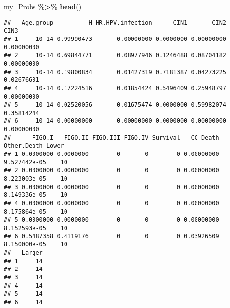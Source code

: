 \documentclass[
]{article}
\newenvironment{Shaded}{\begin{snugshade}}{\end{snugshade}}
\newcommand{\CommentTok}[1]{\textcolor[rgb]{0.56,0.35,0.01}{\textit{#1}}}
\newcommand{\FunctionTok}[1]{\textcolor[rgb]{0.13,0.29,0.53}{\textbf{#1}}}
\newcommand{\NormalTok}[1]{#1}
\newcommand{\SpecialCharTok}[1]{\textcolor[rgb]{0.81,0.36,0.00}{\textbf{#1}}}
\begin{document}
\begin{Shaded}
\end{Shaded}

\begin{Shaded}
\begin{Highlighting}[]
\NormalTok{my\_Probs }\SpecialCharTok{\%\textgreater{}\%}
  \FunctionTok{head}\NormalTok{()}
\end{Highlighting}
\end{Shaded}

\begin{verbatim}
##   Age.group          H HR.HPV.infection      CIN1       CIN2       CIN3
## 1     10-14 0.99990473       0.00000000 0.0000000 0.00000000 0.00000000
## 2     10-14 0.69844771       0.08977946 0.1246488 0.08704182 0.00000000
## 3     10-14 0.19800834       0.01427319 0.7181387 0.04273225 0.02676601
## 4     10-14 0.17224516       0.01854424 0.5496409 0.25948797 0.00000000
## 5     10-14 0.02520056       0.01675474 0.0000000 0.59982074 0.35814244
## 6     10-14 0.00000000       0.00000000 0.0000000 0.00000000 0.00000000
##      FIGO.I   FIGO.II FIGO.III FIGO.IV Survival   CC_Death  Other.Death Lower
## 1 0.0000000 0.0000000        0       0        0 0.00000000 9.527442e-05    10
## 2 0.0000000 0.0000000        0       0        0 0.00000000 8.223003e-05    10
## 3 0.0000000 0.0000000        0       0        0 0.00000000 8.149336e-05    10
## 4 0.0000000 0.0000000        0       0        0 0.00000000 8.175864e-05    10
## 5 0.0000000 0.0000000        0       0        0 0.00000000 8.152593e-05    10
## 6 0.5487358 0.4119176        0       0        0 0.03926509 8.150000e-05    10
##   Larger
## 1     14
## 2     14
## 3     14
## 4     14
## 5     14
## 6     14
\end{verbatim}
\end{document}

